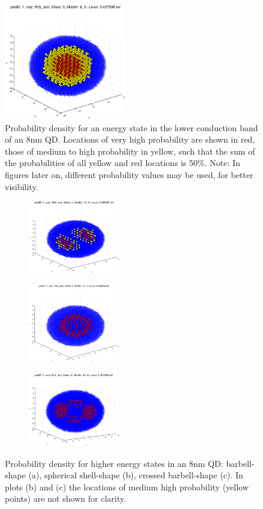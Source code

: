 \begin{figure}
	\centering
	\includegraphics[width=200px]{Fig/Plots/r4CBMod6}
	\caption{Probability density for an energy state in the lower conduction band of an 8nm QD. Locations of very high probability are shown in red, those of medium to high probability in yellow, such that the sum of the probabilities of all yellow and red locations is 50\%. Note: In figures later on, different probability values may be used, for better visibility.}
	\label{fig:sphericalWaveFn}
\end{figure}
%
\begin{figure}
	\centering
	\begin{subfigure}{150px}
		\includegraphics[width=150px]{Fig/Plots/r4CBmod10}
		\caption{}
	\end{subfigure}
	\begin{subfigure}{150px}
		\includegraphics[width=150px]{Fig/Plots/r4CBmod14}
		\caption{}
	\end{subfigure}
	\begin{subfigure}{150px}
		\includegraphics[width=150px]{Fig/Plots/r4CBmod20}
		\caption{}
	\end{subfigure}
	\caption{Probability density for higher energy states in an 8nm QD: barbell-shape (a), spherical shell-shape (b), crossed barbell-shape (c). In plots (b) and (c) the locations of medium high probability (yellow points) are not shown for clarity.}
	\label{fig:HigherModWaveFn}
\end{figure}
%

